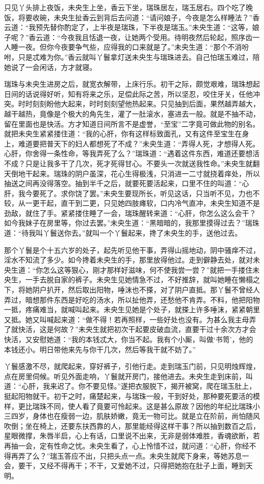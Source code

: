 \documentclass[a4paper,12pt,UTF8,twoside]{ctexbook}
\begin{document}
只见丫头排上夜饭，未央生上坐，香云下坐，瑞珠居左，瑞玉居右。四个吃了晚饭，将要收碗，未央生扯香云到背后去问道：“请问娘子，今夜是怎么样睡法？”香云道：“我预先替你酌定了，上半夜是瑞珠，下半夜是瑞玉。”未央生道：“这等，娘子呢？”香云道：“今夜我且恬退一夜，让她两个受用。待明夜然后轮起，照序齿一人睡一夜。但你今夜要争气些，应得我的口来就是了。”未央生道：“那个不消吩咐，只是忒难为你。”香云就叫丫鬟拿灯送未央生与瑞珠进去。自己怕瑞玉难过，陪她说了一会闲话，方才就寝。

瑞珠与未央生进房之后，就宽衣解带，上床行乐。初干之际，颇觉艰难，瑞珠想起日间的话说得好听，知有将来之乐，足偿此际之苦，所以坚忍，咬住牙关，任他冲突。时时刻刻盼他大起来，时时刻刻望他热起来。只见抽到后面，果然越弄越大，越干越热，竟像是个极大的角先生，灌了一肚滚水，塞进去一般。就是不抽不动，留在里面也是快活。方才知道日间所言不是虚誉，“至宝”二字竟可做此物的别名。就把未央生紧紧搂住道：“我的心肝，你有这样标致面孔，又有这件至宝生在身上，难道要把普天下的妇人都想死了不成？”未央生道：“弄得人死，才想得人死。心肝，你舍得一条性命，等我弄死了么？”瑞珠道：“遇着这件东西，难道还要想活不成？只是让我多干了几次，死才死得甘心。不要头一次就送我性命。”未央生就翻天倒地干起来。瑞珠的阴户虽深，花心生得极浅，只消进一二寸就挠着痒处，所以抽送之间再没得落空。抽到半千之后，就要死要活起来，口里不住的叫道：“心肝，我今要死了。求你饶了罢。”未央生要现所长，听见这话，只当听不见，力也不较，从一更干起，直干到二更，只见她四肢瘫软，口内冷气直冲，未央生知道不是劲敌，就住了手。紧紧搂住睡了一会，瑞珠醒转来道：“心肝，你怎么这么会干？如今我妹子在房里等，你过去罢。”未央生道：“黑暗暗的，我那里摸得过去？”瑞珠道：“待我叫丫鬟送你去。”就叫一个丫鬟起来，搀了未央生的手，送他过去。

那个丫鬟是个十五六岁的处子，起先听见他干事，弄得山摇地动，阴中骚痒不过，淫水不知流了多少。如今搀着未央生的手，那里放得他过。走到僻静去处，就对未央生道：“你怎么这等狠心，刚才那样好滋味，何不使我尝一尝？”就把一手搂住未央生，一手去脱自家的裤子。未央生见她情急不过，不好推辞，就叫她睡在懒榻之下，将她阴户扒开，然后取出阳物，唾沫也不搽，对了阴户直抵。那丫鬟不曾经人弄过，暗想那件东西是好吃的汤水，所以扯他弄，还愁他不肯弄。不料，他把阳物一抵，疼痛难当，就喊叫起来。未央生见她是个处子，就搽上许多唾沫，紧紧朝里又抵。她又叫喊起来道：“做不得！若再照样，一些好处也没有。为甚么我主母弄了就快活，这是何故？”未央生就把初次干起要皮破血流，直要干过十余次方才会快活，又安慰她道：“我的本钱忒大，你当不起。我有个小厮，叫做‘书笥’，他的本钱还小。明日带他来先与你干几次，然后等我干就不妨了。”

丫鬟感激不尽，就爬起来，穿好裤子，引他行走。走到瑞玉门前，只见明烛辉煌，点在房里伺候。听见外面走响，丫鬟就开房门，接他进去。未央生走到床前，叫道：“心肝，我来迟了。你不要见怪。”遂把衣服脱下，揭开被窝，爬在瑞玉肚上，挺起阳物就干。初干之时，痛楚起来，与瑞珠一般，干到好处，那种要死要活的模样，更比瑞珠不同，使人看了竟要可怜起来。这是甚么原故？因他的年纪比瑞珠小三四岁，身体也在瘦弱一边，肌肤娇嫩，竟无一物可比。就是立在阶前，尚怕随风吹倒；坐在椅上，还要东扶西靠的人，那里能经得这样干事？所以抽到数百之后，星眼微撑，朱唇半启，心上有话，口里说不出来，无非是弱体难胜，香魂欲断，若再抽一会，定有性命之忧。未央生看了，心上怜惜不过，就问道：“心肝，你经不得再弄了么？”瑞玉答应不出，只把头点一点。未央生就爬下身来，等她苏息一会，要干，又经不得再干；不干，又爱她不过，只得把她抱在肚子上面，睡到天明。
\end{document}
